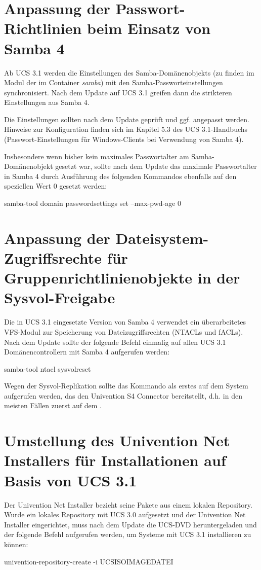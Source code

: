\section{Anpassung der Passwort-Richtlinien beim Einsatz von Samba 4}
Ab UCS 3.1 werden die Einstellungen des Samba-Domänenobjekts (zu
finden im Modul  der \ucsUMC{} im Container \emph{samba}) mit den
Samba-Passworteinstellungen synchronisiert. Nach dem Update auf UCS
3.1 greifen dann die strikteren Einstellungen aus Samba 4.

Die Einstellungen sollten nach dem Update geprüft und ggf. angepasst
werden. Hinweise zur Konfiguration finden sich im Kapitel 5.3 des UCS
3.1-Handbuchs (Passwort-Einstellungen für Windows-Clients bei
Verwendung von Samba 4).

Insbesondere wenn bisher kein maximales Passwortalter am Samba-Domänenobjekt gesetzt war,
sollte nach dem Update das maximale Passwortalter in Samba 4 durch
Ausführung des folgenden Kommandos ebenfalls auf den speziellen Wert 0
gesetzt werden:
\begin{ucsConsoleInput}
samba-tool domain passwordsettings set --max-pwd-age 0
\end{ucsConsoleInput}

\section{Anpassung der Dateisystem-Zugriffsrechte für Gruppenrichtlinienobjekte in der Sysvol-Freigabe}
Die in UCS 3.1 eingesetzte Version von Samba 4 verwendet ein
überarbeitetes VFS-Modul zur Speicherung von Dateizugriffsrechten
(NTACLs und fACLs). Nach dem Update sollte der folgende Befehl
einmalig auf allen UCS 3.1 Domänencontrollern mit Samba 4 aufgerufen
werden:
\begin{ucsConsoleInput}
samba-tool ntacl sysvolreset
\end{ucsConsoleInput}
Wegen der Sysvol-Replikation sollte das Kommando als erstes auf dem System aufgerufen werden, das den
Univention S4 Connector bereitstellt, d.h. in den meisten Fällen
zuerst auf dem \ucsMaster{}.

\section{Umstellung des Univention Net Installers für Installationen auf Basis von UCS 3.1}
Der Univention Net Installer bezieht seine Pakete aus einem lokalen
Repository. Wurde ein lokales Repository mit UCS 3.0 aufgesetzt und
der Univention Net Installer eingerichtet, muss nach dem Update 
die UCS-DVD heruntergeladen und der folgende Befehl aufgerufen werden,
um Systeme mit UCS 3.1 installieren zu können:
\begin{ucsConsoleInput}
univention-repository-create -i UCSISOIMAGEDATEI
\end{ucsConsoleInput}

